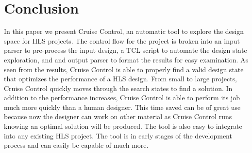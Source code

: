 \documentclass[letterpaper, 10 pt, conference]{IEEEconf}  %
\begin{document}
\section{Conclusion}
In this paper we present Cruise Control, an automatic tool to explore the design space for HLS projects. The control flow for the project is broken into an input parser to pre-process the input design, a TCL script to automate the design state exploration, and and output parser to format the results for easy examination. As seen from the results, Cruise Control is able to properly find a valid design state that optimizes the performance of a HLS design. From small to large projects, Cruise Control quickly moves through the search states to find a solution. In addition to the performance increases, Cruise Control is able to perform its job much more quickly than a human designer. This time saved can be of great use because now the designer can work on other material as Cruise Control runs knowing an optimal solution will be produced. The tool is also easy to integrate into any existing HLS project. The tool is in early stages of the development process and can easily be capable of much more. 
\end{document}
